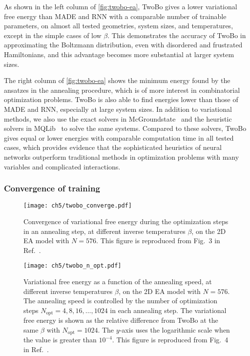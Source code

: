 As shown in the left column of \cref{fig:twobo-ea}, TwoBo gives a lower variational free energy than MADE and RNN with a comparable number of trainable parameters, on almost all tested geometries, system sizes, and temperatures, except in the simple cases of low $\beta$. This demonstrates the accuracy of TwoBo in approximating the Boltzmann distribution, even with disordered and frustrated Hamiltonians, and this advantage becomes more substantial at larger system sizes.

The right column of \cref{fig:twobo-ea} shows the minimum energy found by the ansatzes in the annealing procedure, which is of more interest in combinatorial optimization problems. TwoBo is also able to find energies lower than those of MADE and RNN, especially at large system sizes. In addition to variational methods, we also use the exact solvers in McGroundstate~\cite{charfreitag2022mcsparse} and the heuristic solvers in MQLib~\cite{dunning2018what} to solve the same systems. Compared to these solvers, TwoBo gives equal or lower energies with comparable computation time in all tested cases, which provides evidence that the sophisticated heuristics of neural networks outperform traditional methods in optimization problems with many variables and complicated interactions.

\subsubsection{Convergence of training}

\begin{figure}[htb]
\centering
\texttt{[image: ch5/twobo\_converge.pdf]}
\caption[Convergence of TwoBo variational free energy in training]{
Convergence of variational free energy during the optimization steps in an annealing step, at different inverse temperatures $\beta$, on the 2D EA model with $N = 576$.
This figure is reproduced from Fig.~3 in Ref.~\cite{biazzo2024sparse}.
}
\label{fig:twobo-converge}
\end{figure}

\begin{figure}[htb]
\centering
\texttt{[image: ch5/twobo\_n\_opt.pdf]}
\caption[TwoBo variational free energy vs.\ annealing speed]{
Variational free energy as a function of the annealing speed, at different inverse temperatures $\beta$, on the 2D EA model with $N = 576$.
The annealing speed is controlled by the number of optimization steps $N_\text{opt} = 4, 8, 16, \ldots, 1024$ in each annealing step.
The variational free energy is shown as the relative difference from TwoBo at the same $\beta$ with $N_\text{opt} = 1024$.
The $y$-axis uses the logarithmic scale when the value is greater than $10^{-4}$.
This figure is reproduced from Fig.~4 in Ref.~\cite{biazzo2024sparse}.
}
\label{fig:twobo-n-opt}
\end{figure}

